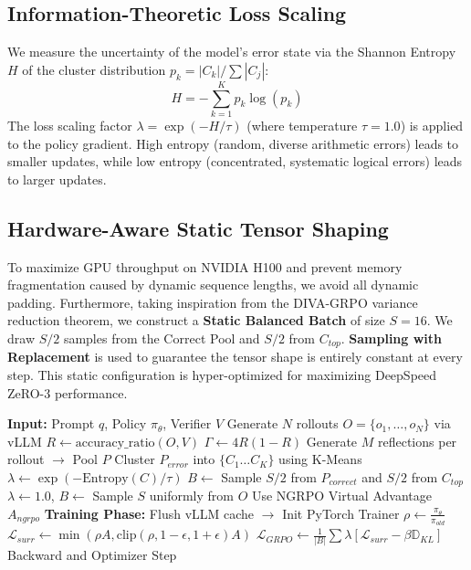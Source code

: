 \documentclass[letterpaper]{article}
\begin{document}
\subsection{Information-Theoretic Loss Scaling}
We measure the uncertainty of the model's error state via the Shannon Entropy $H$ of the cluster distribution $p_k = |C_k| / \sum |C_j|$:
\begin{equation}
H = - \sum_{k=1}^K p_k \log(p_k)
\end{equation}
The loss scaling factor $\lambda = \exp(-H/\tau)$ (where temperature $\tau=1.0$) is applied to the policy gradient. High entropy (random, diverse arithmetic errors) leads to smaller updates, while low entropy (concentrated, systematic logical errors) leads to larger updates.

\subsection{Hardware-Aware Static Tensor Shaping}
To maximize GPU throughput on NVIDIA H100 and prevent memory fragmentation caused by dynamic sequence lengths, we avoid all dynamic padding. Furthermore, taking inspiration from the DIVA-GRPO variance reduction theorem, we construct a \textbf{Static Balanced Batch} of size $S=16$. We draw $S/2$ samples from the Correct Pool and $S/2$ from $C_{top}$. \textbf{Sampling with Replacement} is used to guarantee the tensor shape is entirely constant at every step. This static configuration is hyper-optimized for maximizing DeepSpeed ZeRO-3 performance.

\begin{algorithm}[H]
\caption{H-MSB-GRPO Training Step}
\begin{algorithmic}[1]
\STATE \textbf{Input:} Prompt $q$, Policy $\pi_\theta$, Verifier $V$
\STATE Generate $N$ rollouts $O = \{o_1, \dots, o_N\}$ via vLLM
\STATE $R \gets \text{accuracy\_ratio}(O, V)$
\STATE $\Gamma \gets 4R(1-R)$
    \STATE Generate $M$ reflections per rollout $\to$ Pool $P$
    \STATE Cluster $P_{error}$ into $\{C_1 \dots C_K\}$ using K-Means
    \STATE $\lambda \gets \exp(-\text{Entropy}(C)/\tau)$
    \STATE $B \gets$ Sample $S/2$ from $P_{correct}$ and $S/2$ from $C_{top}$
\ELSE
    \STATE $\lambda \gets 1.0$, $B \gets$ Sample $S$ uniformly from $O$
    \STATE Use NGRPO Virtual Advantage $A_{ngrpo}$
\ENDIF
\STATE \textbf{Training Phase:}
\STATE Flush vLLM cache $\to$ Init PyTorch Trainer
\STATE $\rho \gets \frac{\pi_\theta}{\pi_{old}}$
\STATE $\mathcal{L}_{surr} \gets \min\left(\rho A, \text{clip}\left(\rho, 1-\epsilon, 1+\epsilon\right)A\right)$
\STATE $\mathcal{L}_{GRPO} \gets \frac{1}{|B|} \sum \lambda \left[ \mathcal{L}_{surr} - \beta \mathbb{D}_{KL} \right]$
\STATE Backward and Optimizer Step
\end{algorithmic}
\end{algorithm}
\end{document}
